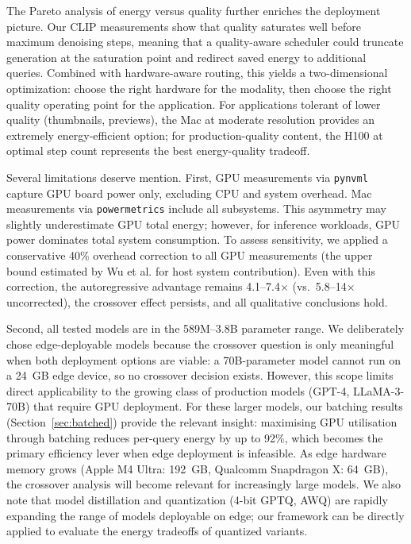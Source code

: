 \documentclass[11pt]{article}
\begin{document}
The Pareto analysis of energy versus quality further enriches the deployment picture. Our CLIP measurements show that quality saturates well before maximum denoising steps, meaning that a quality-aware scheduler could truncate generation at the saturation point and redirect saved energy to additional queries. Combined with hardware-aware routing, this yields a two-dimensional optimization: choose the right hardware for the modality, then choose the right quality operating point for the application. For applications tolerant of lower quality (thumbnails, previews), the Mac at moderate resolution provides an extremely energy-efficient option; for production-quality content, the H100 at optimal step count represents the best energy-quality tradeoff.

Several limitations deserve mention. First, GPU measurements via \texttt{pynvml} capture GPU board power only, excluding CPU and system overhead. Mac measurements via \texttt{powermetrics} include all subsystems. This asymmetry may slightly underestimate GPU total energy; however, for inference workloads, GPU power dominates total system consumption\cite{patterson2021carbon,wu2022sustainable}. To assess sensitivity, we applied a conservative 40\% overhead correction to all GPU measurements (the upper bound estimated by Wu et al.\cite{wu2022sustainable} for host system contribution). Even with this correction, the autoregressive advantage remains 4.1--7.4$\times$ (vs.\ 5.8--14$\times$ uncorrected), the crossover effect persists, and all qualitative conclusions hold.

Second, all tested models are in the 589M--3.8B parameter range. We deliberately chose edge-deployable models because the crossover question is only meaningful when both deployment options are viable: a 70B-parameter model\cite{touvron2023llama} cannot run on a 24~GB edge device, so no crossover decision exists. However, this scope limits direct applicability to the growing class of production models (GPT-4, LLaMA-3-70B) that require GPU deployment. For these larger models, our batching results (Section~\ref{sec:batched}) provide the relevant insight: maximising GPU utilisation through batching reduces per-query energy by up to 92\%, which becomes the primary efficiency lever when edge deployment is infeasible. As edge hardware memory grows (Apple M4 Ultra: 192~GB, Qualcomm Snapdragon X: 64~GB), the crossover analysis will become relevant for increasingly large models. We also note that model distillation and quantization (4-bit GPTQ, AWQ) are rapidly expanding the range of models deployable on edge; our framework can be directly applied to evaluate the energy tradeoffs of quantized variants.
\end{document}
